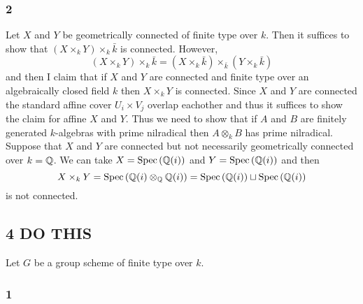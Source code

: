 \documentclass[12pt]{article}
\begin{document}
\subsubsection{2}

Let $X$ and $Y$ be geometrically connected of finite type over $k$. Then it suffices to show that $(X \times_k Y) \times_k \bar{k}$ is connected. However,
\[ (X \times_k Y) \times_k \bar{k} = (X \times_k \bar{k}) \times_{\bar{k}} (Y \times_k \bar{k}) \]
and then I claim that if $X$ and $Y$ are connected and finite type over an algebraically closed field $k$ then $X \times_k Y$ is connected. Since $X$ and $Y$ are connected the standard affine cover $U_i \times V_j$ overlap eachother and thus it suffices to show the claim for affine $X$ and $Y$. Thus we need to show that if $A$ and $B$ are finitely generated $k$-algebras with prime nilradical then $A \otimes_k B$ has prime nilradical. 
\bigskip\\
Suppose that $X$ and $Y$ are connected but not necessarily geometrically connected over $k = \mathbb{Q}$. We can take $X = \mathrm{Spec}\left( \mathbb{Q}(i) \right)$ and $Y = \mathrm{Spec}\left( \mathbb{Q}(i) \right)$ and then 
\[ X \times_k Y = \mathrm{Spec}\left( \mathbb{Q}(i) \otimes_{\mathbb{Q}} \mathbb{Q}(i) \right) = \mathrm{Spec}\left( \mathbb{Q}(i) \right) \sqcup \mathrm{Spec}\left( \mathbb{Q}(i) \right) \]
is not connected.

\subsection{4 DO THIS}

Let $G$ be a group scheme of finite type over $k$.

\subsubsection{1}
\end{document}
